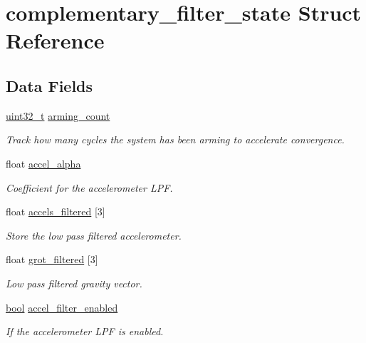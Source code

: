 \hypertarget{structcomplementary__filter__state}{\section{complementary\-\_\-filter\-\_\-state Struct Reference}
\label{structcomplementary__filter__state}
}
\subsection*{Data Fields}
\begin{DoxyCompactItemize}
\item 
\hyperlink{stdint_8h_a435d1572bf3f880d55459d9805097f62}{uint32\-\_\-t} \hyperlink{structcomplementary__filter__state_a25592bc35eb34062d082854dd0dbce44}{arming\-\_\-count}
\begin{DoxyCompactList}\small\item\em Track how many cycles the system has been arming to accelerate convergence. \end{DoxyCompactList}\item 
float \hyperlink{structcomplementary__filter__state_a2a0dfc57428cafd19006fe7cd1dee0ce}{accel\-\_\-alpha}
\begin{DoxyCompactList}\small\item\em Coefficient for the accelerometer L\-P\-F. \end{DoxyCompactList}\item 
float \hyperlink{structcomplementary__filter__state_a88a370dd8e3f412f189e5a585b9d1a52}{accels\-\_\-filtered} \mbox{[}3\mbox{]}
\begin{DoxyCompactList}\small\item\em Store the low pass filtered accelerometer. \end{DoxyCompactList}\item 
float \hyperlink{structcomplementary__filter__state_a91176df07de5e650a8afe8bec74d3ce1}{grot\-\_\-filtered} \mbox{[}3\mbox{]}
\begin{DoxyCompactList}\small\item\em Low pass filtered gravity vector. \end{DoxyCompactList}\item 
\hyperlink{group___exported__types_gaf6a258d8f3ee5206d682d799316314b1}{bool} \hyperlink{structcomplementary__filter__state_a7d259f4954fc2a3ed14353faa41f6414}{accel\-\_\-filter\-\_\-enabled}
\begin{DoxyCompactList}\small\item\em If the accelerometer L\-P\-F is enabled. \end{DoxyCompactList}\item 

\end{DoxyCompactItemize}
